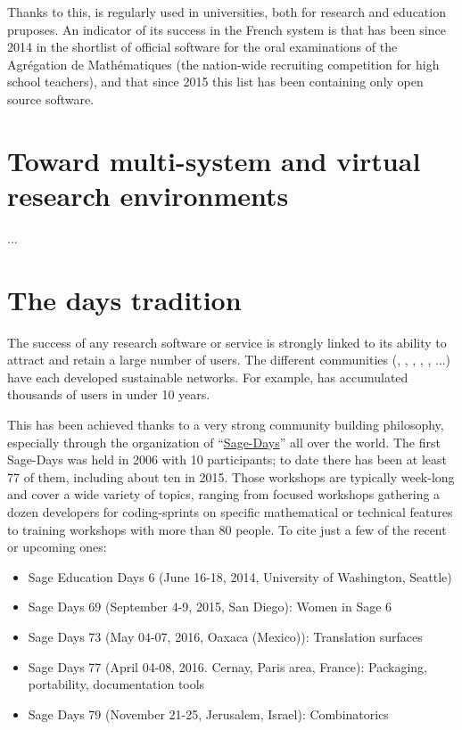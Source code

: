 \documentclass[12pt]{amsbook}
\begin{document}
Thanks to this, \Sage is regularly used in universities, both for
research and education pruposes.  An indicator of its success in the French
system is that \Sage has been since 2014 in the shortlist of official
software for the oral examinations of the Agrégation de Mathématiques
(the nation-wide recruiting competition for high school teachers), and
that since 2015 this list has been containing only open source software.

\section{Toward multi-system and virtual research environments}

...

\section{The \Sage days tradition}

The success of any research software or service is strongly linked to
its ability to attract and retain a large number of users. The
different communities (\Sage, \GAP, \Pari, \Singular, \Jupyter, ...)
have each developed sustainable networks. For example, \Sage has
accumulated thousands of users in under 10 years.

This has been achieved thanks to a very strong community building
philosophy, especially through the organization of
“\href{https://wiki.sagemath.org/Workshops}{Sage-Days}” all over the
world. The first Sage-Days was held in 2006 with 10 participants; to
date there has been at least 77 of them, including about ten in
2015. Those workshops are typically week-long and cover a wide
variety of topics, ranging from focused workshops gathering a dozen
developers for coding-sprints on specific mathematical or technical
features to training workshops with more than 80 people. To cite just
a few of the recent or upcoming ones:

\begin{itemize}
\item Sage Education Days 6 (June 16-18, 2014, University of
  Washington, Seattle)
\item Sage Days 69 (September 4-9, 2015, San Diego): Women in Sage 6
\item Sage Days 73 (May 04-07, 2016, Oaxaca (Mexico)): Translation surfaces
\item Sage Days 77 (April 04-08, 2016. Cernay, Paris area, France):
  Packaging, portability, documentation tools
\item Sage Days 79 (November 21-25, Jerusalem, Israel): Combinatorics
\end{itemize}
\end{document}
